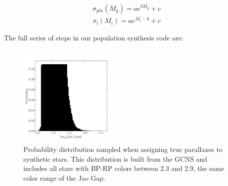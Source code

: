 \begin{align}\label{eqn:plxCalib}
	\sigma_{plx}(M_{g}) = ae^{bM_{g}}+c
\end{align}
\begin{align}\label{eqn:MagCalib}
	\sigma_{i}(M_{i}) = ae^{M_{i}-b}+c
\end{align}

\noindent The full series of steps in our population synthesis code
are:

\begin{figure}
	\centering
	\includegraphics[width=0.45\textwidth]{figures/jaoOpacity/pdist.pdf}
	\caption{Probability distribution sampled when assigning true parallaxes to
	synthetic stars. This distribution is built from the GCNS and includes all
	stars with BP-RP colors between 2.3 and 2.9, the same color range
	of the Jao Gap.}
	\label{fig:pdist}
\end{figure}

